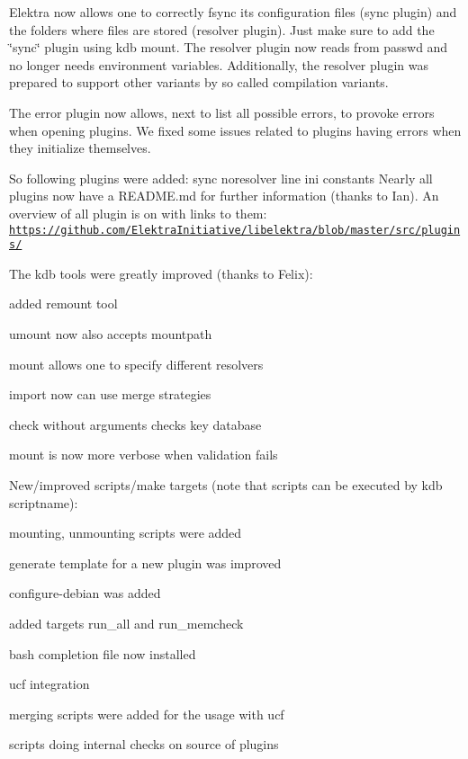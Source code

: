 Elektra now allows one to correctly fsync its configuration files (sync plugin) and the folders where files are stored (resolver plugin). Just make sure to add the \char`\"{}sync\char`\"{} plugin using kdb mount. The resolver plugin now reads from passwd and no longer needs environment variables. Additionally, the resolver plugin was prepared to support other variants by so called compilation variants.

The error plugin now allows, next to list all possible errors, to provoke errors when opening plugins. We fixed some issues related to plugins having errors when they initialize themselves.

So following plugins were added\+: sync noresolver line ini constants Nearly all plugins now have a R\+E\+A\+D\+M\+E.\+md for further information (thanks to Ian). An overview of all plugin is on with links to them\+: \href{https://github.com/ElektraInitiative/libelektra/blob/master/src/plugins/}{\tt https\+://github.\+com/\+Elektra\+Initiative/libelektra/blob/master/src/plugins/}

The kdb tools were greatly improved (thanks to Felix)\+:
\begin{DoxyItemize}
\item added remount tool
\item umount now also accepts mountpath
\item mount allows one to specify different resolvers
\item import now can use merge strategies
\item check without arguments checks key database
\item mount is now more verbose when validation fails
\end{DoxyItemize}

New/improved scripts/make targets (note that scripts can be executed by kdb scriptname)\+:
\begin{DoxyItemize}
\item mounting, unmounting scripts were added
\item generate template for a new plugin was improved
\item configure-\/debian was added
\item added targets run\+\_\+all and run\+\_\+memcheck
\item bash completion file now installed
\item ucf integration
\item merging scripts were added for the usage with ucf
\item scripts doing internal checks on source of plugins
\end{DoxyItemize}

